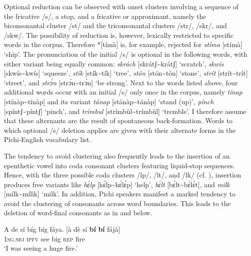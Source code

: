 Optional reduction can be observed with onset clusters involving a sequence of the fricative /s/, a stop, and a fricative or approximant, namely the biconsonantal cluster /st/ and the triconsonantal clusters /str/, /skr/, and /skw/. The possibility of reduction is, however, lexically restricted to specific words in the corpus. Therefore *[tímà] is, for example, rejected for \textit{stíma} [stímà] ‘ship’. The pronunciation of the initial /s/ is optional in the following words, with either variant being equally common: \textit{skrách} [skrátʃ{\textasciitilde}krátʃ] ‘scratch’,\textit{ skwís} [skwís{\textasciitilde}kwís] ‘squeeze’, \textit{stík} [stík{\textasciitilde}tík] ‘tree’, \textit{stón} [stón{\textasciitilde}tón] ‘stone’, \textit{strít} [strít{\textasciitilde}trít] ‘street’, and \textit{strɔ́n} [strɔ́n{\textasciitilde}trɔ́n] ‘be strong’. Next to the words listed above, four additional words occur with an initial /s/ only once in the corpus, namely \textit{tínap} [stínàp{\textasciitilde}tínàp] and its variant \textit{tánap} [stánàp{\textasciitilde}tánàp] ‘stand (up)’, \textit{pínch} [spíntʃ{\textasciitilde}píntʃ] ‘pinch’, and \textit{trímbul} [strímbùl{\textasciitilde}trímbùl] ‘tremble’. I therefore assume that these alternants are the result of spontaneous back-formation. Words to which optional /s/ deletion applies are given with their alternate forms in the Pichi-English vocabulary list.



The tendency to avoid clustering also frequently leads to the insertion of an epenthetic vowel into coda consonant clusters featuring liquid-stop sequences. Hence, with the three possible coda clusters /lp/, /lt/, and /lk/ (cf. ), insertion produces free variants like \textit{hɛ́lp} [hɛ́lp{\textasciitilde}hɛ́lɛ̀p] ‘help’, \textit{bɛ́lt} [bɛ́lt{\textasciitilde}bɛ́lɛ̀t], and \textit{milk} [mílk{\textasciitilde}mílìk] ‘milk’. In addition, Pichi speakers manifest a marked tendency to avoid the clustering of consonants across word boundaries. This leads to the deletion of word-final consonants as in  and  below. 



\ea%
    \label{ex:key:39}
    \gll   A    de  sí    bíg  bíg  fáya.      \textup{[à  dè  sí  \textbf{bí}  \textbf{bí}  fájà]}\\
\textsc{1sg.sbj}  \textsc{ipfv}  see    big  \textsc{rep}  fire\\

\glt ‘I was seeing a huge fire.’\index{}
\z


